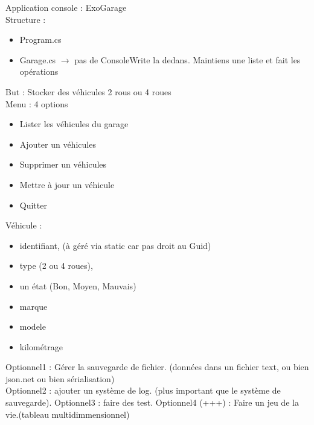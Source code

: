 \documentclass[a4paper,12pt,twoside]{article}
\begin{document}
Application console : ExoGarage \\
Structure : 
\begin{itemize}
 \item Program.cs
 \item Garage.cs $\to$ pas de ConsoleWrite la dedans. Maintiens une liste et fait les opérations
\end{itemize}
But : Stocker des véhicules 2 rous ou 4 roues\\
Menu : 4 options
\begin{itemize}
 \item Lister les véhicules du garage
 \item Ajouter un véhicules
 \item Supprimer un véhicules 
 \item Mettre à jour un véhicule
 \item Quitter
\end{itemize}
Véhicule : 
\begin{itemize}
 \item identifiant, (à géré via static car pas droit au Guid)
 \item type (2 ou 4 roues),
 \item  un état (Bon, Moyen, Mauvais)
 \item marque 
 \item modele
 \item kilométrage
\end{itemize}
Optionnel1 : Gérer la sauvegarde de fichier. (données dans un fichier text, ou bien json.net ou bien sérialisation) \\
Optionnel2 : ajouter un système de log. (plus important que le système de sauvegarde).
Optionnel3 : faire des test.
Optionnel4 (+++) : Faire un jeu de la vie.(tableau multidimmensionnel)


\newpage
\printglossary[type=\acronymtype]%
\glsaddallunused %
\printglossary[type = main,nonumberlist]%
\end{document}
